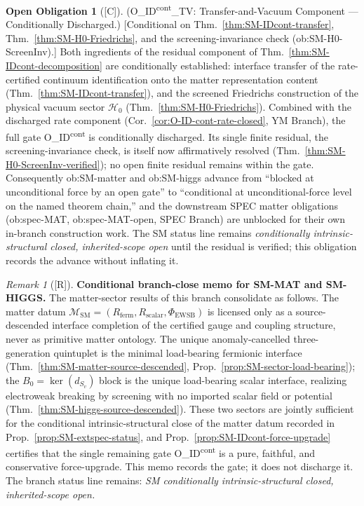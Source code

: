 \documentclass[12pt,oneside]{amsbook}
\theoremstyle{plain}
\theoremstyle{definition}
\newtheorem{obligation}[theorem]{Open Obligation}
\theoremstyle{remark}
\newtheorem{remark}[theorem]{Remark}
\newcommand{\status}[1]{\textup{[#1]}}
\begin{document}
\begin{obligation}[\status{C}]\label{ob:SM-IDcont-TV}
\textup{(O\_ID\textsuperscript{cont}\_TV: Transfer-and-Vacuum
Component --- Conditionally Discharged.)}
\textup{[Conditional on Thm.~\ref{thm:SM-IDcont-transfer},
Thm.~\ref{thm:SM-H0-Friedrichs}, and the screening-invariance
check (ob:SM-H0-ScreenInv).]}
Both ingredients of the residual component of
Thm.~\ref{thm:SM-IDcont-decomposition} are conditionally
established: interface transfer of the rate-certified continuum
identification onto the matter representation content
(Thm.~\ref{thm:SM-IDcont-transfer}), and the screened Friedrichs
construction of the physical vacuum sector $\mathcal{H}_0$
(Thm.~\ref{thm:SM-H0-Friedrichs}).  Combined with the discharged
rate component (Cor.~\ref{cor:O-ID-cont-rate-closed}, YM Branch),
the full gate O\_ID\textsuperscript{cont} is conditionally
discharged.  Its single finite residual, the screening-invariance
check, is itself now affirmatively resolved
(Thm.~\ref{thm:SM-H0-ScreenInv-verified}); no open finite residual
remains within the gate.  Consequently ob:SM-matter and
ob:SM-higgs advance from ``blocked at unconditional force by an
open gate'' to ``conditional at unconditional-force level on the
named theorem chain,'' and the downstream SPEC matter obligations
(ob:spec-MAT, ob:spec-MAT-open, SPEC Branch) are unblocked for
their own in-branch construction work.  The SM status line
remains \emph{conditionally intrinsic-structural closed,
inherited-scope open} until the residual is verified; this
obligation records the advance without inflating it.
\end{obligation}


\begin{remark}[\status{R}]\label{rem:SM-matter-close-memo}
\textbf{Conditional branch-close memo for SM-MAT and SM-HIGGS.}
The matter-sector results of this branch consolidate as follows.
The matter datum $\mathcal{M}_{\mathrm{SM}} = (R_{\mathrm{ferm}},
R_{\mathrm{scalar}}, \Phi_{\mathrm{EWSB}})$ is licensed only as a
source-descended interface completion of the certified gauge and
coupling structure, never as primitive matter ontology. The unique
anomaly-cancelled three-generation quintuplet is the minimal
load-bearing fermionic interface
(Thm.~\ref{thm:SM-matter-source-descended},
Prop.~\ref{prop:SM-sector-load-bearing}); the $B_0 = \ker(d_{S_v})$
block is the unique load-bearing scalar interface, realizing
electroweak breaking by screening with no imported scalar field or
potential (Thm.~\ref{thm:SM-higgs-source-descended}). These two
sectors are jointly sufficient for the conditional
intrinsic-structural close of the matter datum recorded in
Prop.~\ref{prop:SM-extspec-status}, and
Prop.~\ref{prop:SM-IDcont-force-upgrade} certifies that the single
remaining gate O\_ID\textsuperscript{cont} is a pure, faithful,
and conservative force-upgrade. This memo records the gate; it does
not discharge it. The branch status line remains: \emph{SM
conditionally intrinsic-structural closed, inherited-scope open.}
\end{remark}
\end{document}
